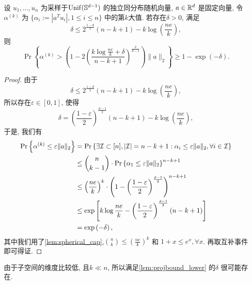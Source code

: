 \begin{lemma} \label{lem:projbound_lower}
  设 \(u_1, \ldots, u_n \) 为采样于\(\operatorname{Unif}(\mathbb{S}^{d-1})\) 的独立同分布随机向量,
  \(a \in \mathbb{R}^d \) 是固定向量,
  令 \(\alpha^{(k)}\) 为 \(\{\alpha_i:= |a^T u_i|, 1 \le i \le n\}\) 中的第\(k\)大值.
  若存在\(\delta > 0\), 满足
  \[\delta \le 2^{\frac{1-d}{2}}(n-k+1)-k\log\left( \frac{ne}{k} \right),\]
  则
  \[
    \Pr\left\{\alpha^{(k)}>\left( 1-2\left(\frac{k\log \frac{ne}{k}+\delta}{n-k+1}
    \right)^{\frac{2}{d-1}}\right) \|a\|_2\right\}\ge 1-\exp(-\delta).
  \]
\end{lemma}
\begin{proof}
  由于
  \[\delta \le 2^{\frac{1-d}{2}}(n-k+1)-k\log\left( \frac{ne}{k} \right),\]
  所以存在\(\varepsilon\in [0, 1]\), 使得
  \[\delta=\left(\frac{1-\varepsilon}{2}\right)^{\frac{d-1}{2}}(n-k+1)-k\log\left( \frac{ne}{k} \right),\]
  于是, 我们有
  \begin{align*}
    \Pr\left\{\alpha^{(k)} \le \varepsilon \|a\|_2\right\} &= \Pr\left\{\exists \mathcal{I} \subset [n], |\mathcal{I}|=n-k+1:
  \alpha_i \le \varepsilon \|a\|_2, \forall i \in \mathcal{I}\right\} \\
    &\le \binom{n}{k-1} \cdot \Pr \left\{ \alpha_1 \le \varepsilon
    \|a\|_2\right\}^{n-k+1}\\
    &\le \left( \frac{ne}{k} \right)^k \cdot \left( 1-\left(
    \frac{1-\varepsilon}{2} \right)^{\frac{d-1}{2}} \right)^{n-k+1} \\
    &\le \exp \left[ k \log \frac{ne}{k}-\left(
    \frac{1-\varepsilon}{2}\right)^{\frac{d-1}{2}} (n-k+1) \right]\\
    &= \exp\left( -\delta \right),
  \end{align*}
  其中我们用了\autoref{lem:spherical_cap},\(\binom{n}{k}\le
  (\frac{ne}{k})^k\) 和 \(1+x\le e^x, \forall x\).
  再取互补事件即可得证.
\end{proof}

\begin{remark}
  由于子空间的维度比较低, 且\(k\ll n\), 所以满足\autoref{lem:projbound_lower}
  的\(\delta\) 很可能存在.
\end{remark}

